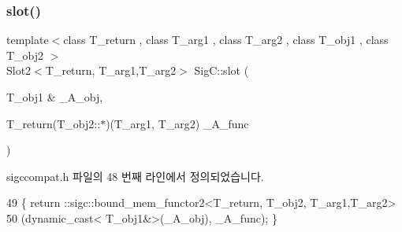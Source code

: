 \subsubsection{\texorpdfstring{slot()}{slot()}\hspace{0.1cm}{\footnotesize\ttfamily [3/3]}}
{\footnotesize\ttfamily template$<$class T\+\_\+return , class T\+\_\+arg1 , class T\+\_\+arg2 , class T\+\_\+obj1 , class T\+\_\+obj2 $>$ \\
Slot2$<$T\+\_\+return, T\+\_\+arg1,T\+\_\+arg2$>$ Sig\+C\+::slot (\begin{DoxyParamCaption}\item[{T\+\_\+obj1 \&}]{\+\_\+\+A\+\_\+obj,  }\item[{T\+\_\+return(T\+\_\+obj2\+::$\ast$)(T\+\_\+arg1, T\+\_\+arg2)}]{\+\_\+\+A\+\_\+func }\end{DoxyParamCaption})\hspace{0.3cm}{\ttfamily [inline]}}



sigccompat.\+h 파일의 48 번째 라인에서 정의되었습니다.


\begin{DoxyCode}
49 \{ return ::sigc::bound\_mem\_functor2<T\_return, T\_obj2, T\_arg1,T\_arg2>
50              (\textcolor{keyword}{dynamic\_cast<} T\_obj1&\textcolor{keyword}{>}(\_A\_obj), \_A\_func); \}
\end{DoxyCode}

